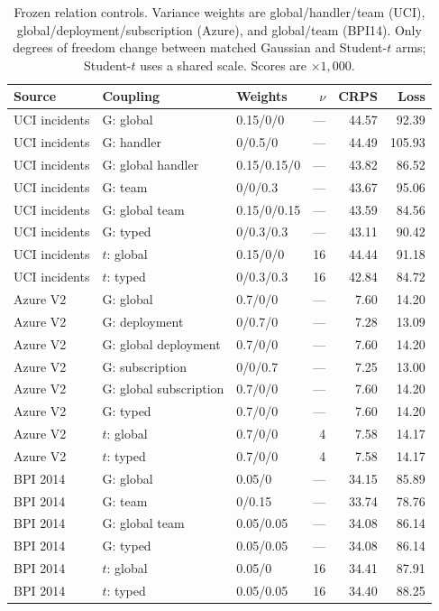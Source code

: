 \begin{table}[t]
\centering\small
\caption{Frozen relation controls. Variance weights are global/handler/team (UCI), global/deployment/subscription (Azure), and global/team (BPI14). Only degrees of freedom change between matched Gaussian and Student-$t$ arms; Student-$t$ uses a shared scale. Scores are $\times 1,000$.}\label{tab:extension-relations}
\begin{tabular}{lllrrr}
\toprule
Source & Coupling & Weights & $\nu$ & CRPS & Loss \\
\midrule
UCI incidents & G: global & 0.15/0/0 & --- & 44.57 & 92.39 \\
UCI incidents & G: handler & 0/0.5/0 & --- & 44.49 & 105.93 \\
UCI incidents & G: global handler & 0.15/0.15/0 & --- & 43.82 & 86.52 \\
UCI incidents & G: team & 0/0/0.3 & --- & 43.67 & 95.06 \\
UCI incidents & G: global team & 0.15/0/0.15 & --- & 43.59 & 84.56 \\
UCI incidents & G: typed & 0/0.3/0.3 & --- & 43.11 & 90.42 \\
UCI incidents & $t$: global & 0.15/0/0 & 16 & 44.44 & 91.18 \\
UCI incidents & $t$: typed & 0/0.3/0.3 & 16 & 42.84 & 84.72 \\
Azure V2 & G: global & 0.7/0/0 & --- & 7.60 & 14.20 \\
Azure V2 & G: deployment & 0/0.7/0 & --- & 7.28 & 13.09 \\
Azure V2 & G: global deployment & 0.7/0/0 & --- & 7.60 & 14.20 \\
Azure V2 & G: subscription & 0/0/0.7 & --- & 7.25 & 13.00 \\
Azure V2 & G: global subscription & 0.7/0/0 & --- & 7.60 & 14.20 \\
Azure V2 & G: typed & 0.7/0/0 & --- & 7.60 & 14.20 \\
Azure V2 & $t$: global & 0.7/0/0 & 4 & 7.58 & 14.17 \\
Azure V2 & $t$: typed & 0.7/0/0 & 4 & 7.58 & 14.17 \\
BPI 2014 & G: global & 0.05/0 & --- & 34.15 & 85.89 \\
BPI 2014 & G: team & 0/0.15 & --- & 33.74 & 78.76 \\
BPI 2014 & G: global team & 0.05/0.05 & --- & 34.08 & 86.14 \\
BPI 2014 & G: typed & 0.05/0.05 & --- & 34.08 & 86.14 \\
BPI 2014 & $t$: global & 0.05/0 & 16 & 34.41 & 87.91 \\
BPI 2014 & $t$: typed & 0.05/0.05 & 16 & 34.40 & 88.25 \\
\bottomrule
\end{tabular}
\end{table}
